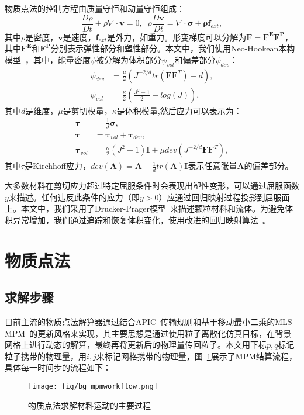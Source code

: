 物质点法的控制方程由质量守恒和动量守恒组成：
\begin{equation}
\frac{D\rho}{Dt}+\rho \nabla \cdot \mathbf{v} = 0, \;\;
\rho \frac{D \mathbf{v}}{Dt} = \nabla \cdot\mathbf{\sigma} + \mathbf{\rho} \mathbf{f}_{ext},
\end{equation}
其中$\rho$是密度，$\mathbf{v}$是速度，$\mathbf{f}_{ext}$是外力，如重力。形变梯度可以分解为$\mathbf{F}=\mathbf{F^E}\mathbf{F^P}$，其中$\mathbf{F^E}$和$\mathbf{F^P}$分别表示弹性部分和塑性部分。本文中，我们使用Neo-Hookean本构模型~\cite{DBLP:journals/tog/TuLZLWWQ24}，其中，能量密度$\psi$被分解为体积部分$\psi_{vol}$和偏差部分$\psi_{dev}$：
\begin{equation}
    \begin{aligned}
        \psi_{dev} &= \frac{\mu}{2}(J^{-2/d} tr(\mathbf{F}\mathbf{F}^T) - d), \\
        \psi_{vol} &= \frac{\kappa}{2}(
        \frac{J^2-1}{2}-log(J)
        ),
    \end{aligned}
\end{equation}
其中$d$是维度，$\mu$是剪切模量，$\kappa$是体积模量,然后应力可以表示为：
\begin{equation}
\begin{aligned}
    \mathbf{\tau} &= \frac{1}{J}\mathbf{\sigma},\\
    \mathbf{\tau} &= \mathbf{\tau}_{vol}+\mathbf{\tau}_{dev},\\
    \mathbf{\tau}_{vol} &= \frac{\kappa}{2}(J^2-1)\mathbf{I}+\mu dev(J^{-2/d} \mathbf{F}\mathbf{F}^T),
\end{aligned}
\end{equation}
其中$\tau$是Kirchhoff应力，$dev(\mathbf{A})=\mathbf{A}-\frac{1}{d}tr(\mathbf{A})\mathbf{I}$表示任意张量$\mathbf{A}$的偏差部分。

大多数材料在剪切应力超过特定屈服条件时会表现出塑性变形，可以通过屈服函数$y$来描述。任何违反此条件的应力（即$y > 0$）应通过回归映射过程投影到屈服面上。本文中，我们采用了Drucker-Prager模型~\cite{klar2016drucker}来描述颗粒材料和流体。为避免体积异常增加，我们通过追踪和恢复体积变化，使用改进的回归映射算法~\cite{10.1145/3072959.3073651}。


\section{物质点法}
\subsection{求解步骤}
目前主流的物质点法解算器通过结合APIC~\cite{jiang2015affine}传输规则和基于移动最小二乘的MLS-MPM~\cite{hu2018moving}的更新风格来实现，其主要思想是通过使用粒子离散化仿真目标，在背景网格上进行动态的解算，最终再将更新后的物理量传回粒子。本文用下标\(p,q\)标记粒子携带的物理量，用\(i,j\)来标记网格携带的物理量，图~\ref{fig:bg_mpmworkflow}展示了MPM结算流程，具体每一时间步的流程如下：
\begin{figure}[h]
    \centering
    \texttt{[image: fig/bg\_mpmworkflow.png]} %
    \caption{物质点法求解材料运动的主要过程}
    \label{fig:bg_mpmworkflow}
\end{figure}




